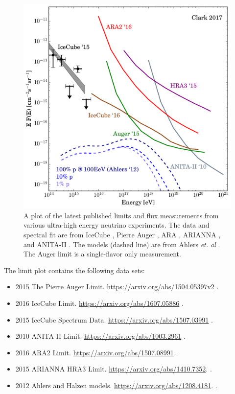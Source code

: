 \documentclass[preprint,12pt]{article}
\begin{document}
\begin{figure}[h]
\centering
\includegraphics[width=.9\textwidth]{leading_limits_plot.pdf}
\caption{A plot of the latest published limits and flux measurements from various ultra-high energy neutrino experiments. The data and spectral fit are from IceCube \cite{IceCube2015, IceCube2016}, Pierre Auger \cite{Auger2015}, ARA \cite{Ara2016}, ARIANNA \cite{Arriana2015}, and ANITA-II \cite{Anita2010Erratum}. The models (dashed line) are from Ahlers \textit{et. al} \cite{Ahlers2012}. The Auger limit is a single-flavor only measurement.}
\label{fig:sigcondblock1}
\end{figure}

\newpage

The limit plot contains the following data sets:

\begin{itemize}
\item 2015 The Pierre Auger Limit. \url{https://arxiv.org/abs/1504.05397v2} \cite{Auger2015}.
\item 2016 IceCube Limit. \url{https://arxiv.org/abs/1607.05886} \cite{IceCube2016}.
\item 2015 IceCube Spectrum Data. \url{https://arxiv.org/abs/1507.03991}  \cite{IceCube2015}.
\item 2010 ANITA-II Limit. \url{https://arxiv.org/abs/1003.2961} \cite{Anita2010, Anita2010Erratum}.
\item 2016 ARA2 Limit. \url{https://arxiv.org/abs/1507.08991} \cite{Ara2016}.
\item 2015 ARIANNA HRA3 Limit. \url{https://arxiv.org/abs/1410.7352}. \cite{Arriana2015}.
\item 2012 Ahlers and Halzen models. \url{https://arxiv.org/abs/1208.4181}. \cite{Ahlers2012}.
\end{itemize}


 
\end{document}
